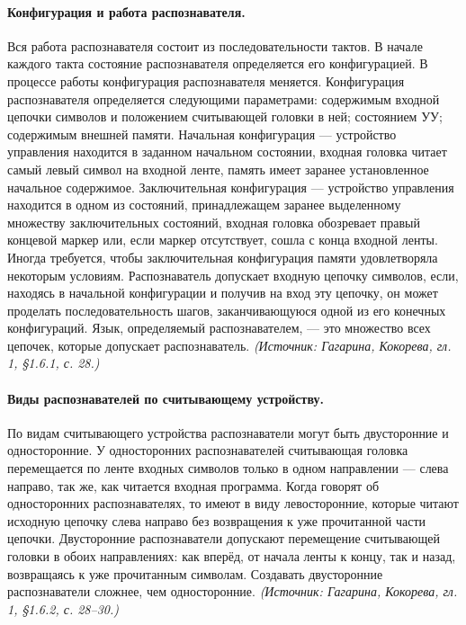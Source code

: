 \documentclass[a4paper,12pt]{article}
\begin{document}
\paragraph{Конфигурация и работа распознавателя.}
Вся работа распознавателя состоит из последовательности тактов. В начале каждого такта состояние распознавателя определяется его конфигурацией. В процессе работы конфигурация распознавателя меняется. Конфигурация распознавателя определяется следующими параметрами: содержимым входной цепочки символов и положением считывающей головки в ней; состоянием УУ; содержимым внешней памяти. Начальная конфигурация — устройство управления находится в заданном начальном состоянии, входная головка читает самый левый символ на входной ленте, память имеет заранее установленное начальное содержимое. Заключительная конфигурация — устройство управления находится в одном из состояний, принадлежащем заранее выделенному множеству заключительных состояний, входная головка обозревает правый концевой маркер или, если маркер отсутствует, сошла с конца входной ленты. Иногда требуется, чтобы заключительная конфигурация памяти удовлетворяла некоторым условиям. Распознаватель допускает входную цепочку символов, если, находясь в начальной конфигурации и получив на вход эту цепочку, он может проделать последовательность шагов, заканчивающуюся одной из его конечных конфигураций. Язык, определяемый распознавателем, — это множество всех цепочек, которые допускает распознаватель.
\textit{(Источник: Гагарина, Кокорева, гл. 1, §1.6.1, с. 28.)}

\paragraph{Виды распознавателей по считывающему устройству.}
По видам считывающего устройства распознаватели могут быть двусторонние и односторонние. У односторонних распознавателей считывающая головка перемещается по ленте входных символов только в одном направлении — слева направо, так же, как читается входная программа. Когда говорят об односторонних распознавателях, то имеют в виду левосторонние, которые читают исходную цепочку слева направо без возвращения к уже прочитанной части цепочки. Двусторонние распознаватели допускают перемещение считывающей головки в обоих направлениях: как вперёд, от начала ленты к концу, так и назад, возвращаясь к уже прочитанным символам. Создавать двусторонние распознаватели сложнее, чем односторонние.
\textit{(Источник: Гагарина, Кокорева, гл. 1, §1.6.2, с. 28--30.)}
\end{document}
